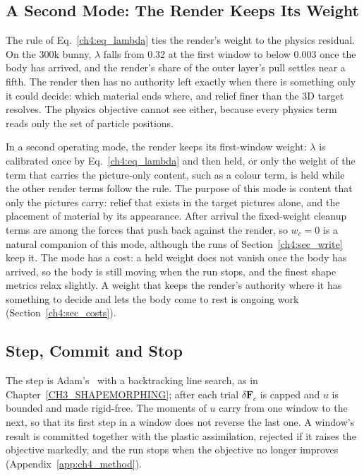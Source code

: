 \subsection{A Second Mode: The Render Keeps Its Weight}
\label{ch4:sec_held}
The rule of Eq.~\eqref{ch4:eq_lambda} ties the render's weight to the physics residual. On the 300k bunny, $\lambda$ falls
from 0.32 at the first window to below 0.003 once the body has arrived, and the render's share of the outer layer's pull
settles near a fifth. The render then has no authority left exactly when there is something only it could decide: which
material ends where, and relief finer than the 3D target resolves. The physics objective cannot see either, because
every physics term reads only the set of particle positions.

In a second operating mode, the render keeps its first-window weight: $\lambda$ is calibrated once by
Eq.~\eqref{ch4:eq_lambda} and then held, or only the weight of the term that carries the picture-only content, such as a
colour term, is held while the other render terms follow the rule. The purpose of this mode is content that only the
pictures carry: relief that exists in the target pictures alone, and the placement of material by its appearance. After
arrival the fixed-weight cleanup terms are among the forces that push back against the render, so $w_c=0$ is a natural
companion of this mode, although the runs of Section~\ref{ch4:sec_write} keep it. The mode has a cost: a held weight does
not vanish once the body has arrived, so the body is still moving when the run stops, and the finest shape metrics relax
slightly. A weight that keeps the render's authority where it has something to decide and lets the body come to rest is
ongoing work (Section~\ref{ch4:sec_costs}).

\subsection{Step, Commit and Stop}
The step is Adam's~\citep{kingma2014adam} with a backtracking line search, as in
Chapter~\ref{CH3_SHAPEMORPHING}; after each trial $\delta\mathbf{F}_c$ is capped and $u$ is bounded and made rigid-free.
The moments of $u$ carry from one window to the next, so that its first step in a window does not reverse the last one.
A window's result is committed together with the plastic assimilation, rejected if it raises the objective markedly, and
the run stops when the objective no longer improves (Appendix~\ref{app:ch4_method}).

